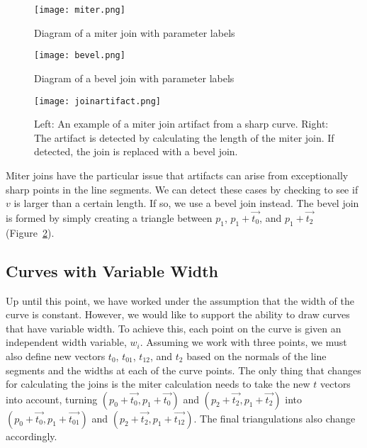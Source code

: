 \begin{figure}
	\begin{center}
	\label{fig:miter}
		\texttt{[image: miter.png]}
		\caption{Diagram of a miter join with parameter labels}
	\end{center}
\end{figure}

\begin{figure}
	\begin{center}
	\label{fig:bevel}
		\texttt{[image: bevel.png]}
		\caption{Diagram of a bevel join with parameter labels}
	\end{center}
\end{figure}

\begin{figure}
\texttt{[image: joinartifact.png]}
\caption[Handling Miter artifacts]{Left: An example of a miter join artifact from a sharp curve. Right: The artifact is detected by calculating the length of the miter join. If detected, the join is replaced with a bevel join.}
\end{figure}

Miter joins have the particular issue that artifacts can arise from exceptionally sharp points in the line segments.
We can detect these cases by checking to see if $v$ is larger than a certain length.
If so, we use a bevel join instead.
The bevel join is formed by simply creating a triangle between $p_1$, $p_1 + \vec{t_0}$, and $p_1 + \vec{t_2}$ (Figure~\ref{fig:bevel}).

\subsection{Curves with Variable Width}
Up until this point, we have worked under the assumption that the width of the curve is constant.
However, we would like to support the ability to draw curves that have variable width.
To achieve this, each point on the curve is given an independent width variable, $w_i$.
Assuming we work with three points, we must also define new vectors $t_0$, $t_{01}$, $t_{12}$, and $t_2$ based on the normals of the line segments and the widths at each of the curve points.
The only thing that changes for calculating the joins is the miter calculation needs to take the new $t$ vectors into account, turning $(p_0 + \vec{t_0}, p_1 + \vec{t_0})$ and $(p_2 + \vec{t_2}, p_1 + \vec{t_2})$ into $(p_0 + \vec{t_0}, p_1 + \vec{t_{01}})$ and $(p_2 + \vec{t_2}, p_1 + \vec{t_{12}})$.
The final triangulations also change accordingly.

